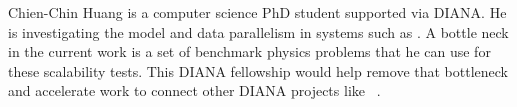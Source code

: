 Chien-Chin Huang is a computer science PhD student supported via DIANA.
He is investigating the model and data parallelism in systems such as .
A bottle neck in the current work is a set of benchmark physics problems that he can use for these scalability tests.
This DIANA fellowship would help remove that bottleneck and accelerate work to connect other DIANA projects like ~\cite{histogrammar2017}.
